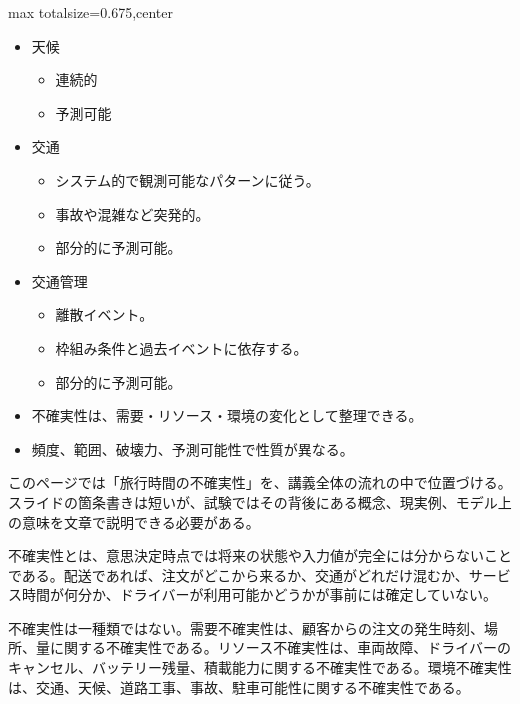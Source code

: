 \clearpage
{}
\begin{adjustbox}{max totalsize={\textwidth}{0.675\textheight},center}
\begin{minipage}{\textwidth}\scriptsize
\begin{minipage}[t]{0.485\textwidth}
\begin{itemize}
\item 天候
\begin{itemize}
\item 連続的
\item 予測可能
\end{itemize}
\item 交通
\begin{itemize}
\item システム的で観測可能なパターンに従う。
\item 事故や混雑など突発的。
\item 部分的に予測可能。
\end{itemize}
\item 交通管理
\begin{itemize}
\item 離散イベント。
\item 枠組み条件と過去イベントに依存する。
\item 部分的に予測可能。
\end{itemize}
\end{itemize}
\begin{itemize}
\item 不確実性は、需要・リソース・環境の変化として整理できる。
\item 頻度、範囲、破壊力、予測可能性で性質が異なる。
\end{itemize}
\end{minipage}\hfill
\begin{minipage}[t]{0.485\textwidth}
このページでは「旅行時間の不確実性」を、講義全体の流れの中で位置づける。スライドの箇条書きは短いが、試験ではその背後にある概念、現実例、モデル上の意味を文章で説明できる必要がある。\par
不確実性とは、意思決定時点では将来の状態や入力値が完全には分からないことである。配送であれば、注文がどこから来るか、交通がどれだけ混むか、サービス時間が何分か、ドライバーが利用可能かどうかが事前には確定していない。\par
不確実性は一種類ではない。需要不確実性は、顧客からの注文の発生時刻、場所、量に関する不確実性である。リソース不確実性は、車両故障、ドライバーのキャンセル、バッテリー残量、積載能力に関する不確実性である。環境不確実性は、交通、天候、道路工事、事故、駐車可能性に関する不確実性である。\par

\end{minipage}
\end{minipage}
\end{adjustbox}

